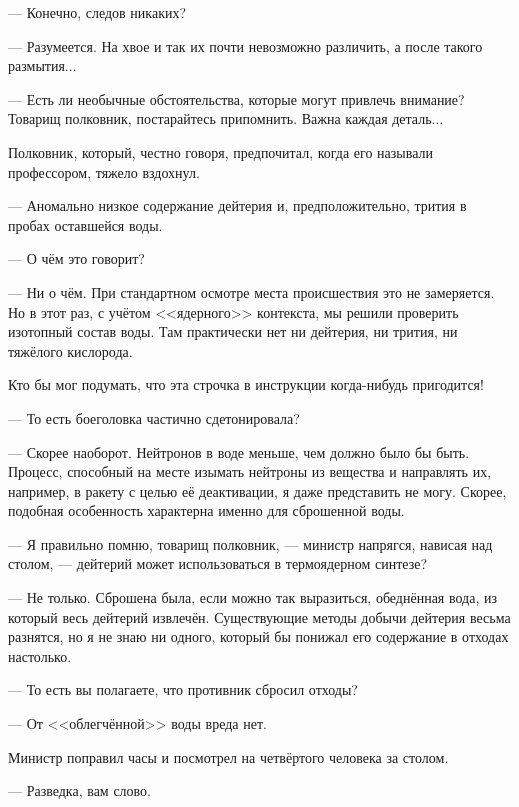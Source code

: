 --- Конечно, следов никаких?

--- Разумеется. На хвое и так их почти невозможно различить, а после такого размытия...

--- Есть ли необычные обстоятельства, которые могут привлечь внимание? Товарищ полковник, постарайтесь припомнить.
Важна каждая деталь...

Полковник, который, честно говоря, предпочитал, когда его называли профессором, тяжело вздохнул.

--- Аномально низкое содержание дейтерия и, предположительно, трития в пробах оставшейся воды.

--- О чём это говорит?

--- Ни о чём. При стандартном осмотре места происшествия это не замеряется. Но в этот раз, с учётом <<ядерного>> контекста,
мы решили проверить изотопный состав воды. Там практически нет ни дейтерия, ни трития, ни тяжёлого кислорода.

Кто бы мог подумать, что эта строчка в инструкции когда-нибудь пригодится!

--- То есть боеголовка частично сдетонировала?

--- Скорее наоборот. Нейтронов в воде меньше, чем должно было бы быть.
Процесс, способный на месте изымать нейтроны из вещества и направлять их, например, в ракету с целью её деактивации,
я даже представить не могу. Скорее, подобная особенность характерна именно для сброшенной воды.

--- Я правильно помню, товарищ полковник, --- министр напрягся, нависая над столом,
--- дейтерий может использоваться в термоядерном синтезе?

--- Не только. Сброшена была, если можно так выразиться, обеднённая вода, из который весь дейтерий извлечён.
Существующие методы добычи дейтерия весьма разнятся, но я не знаю ни одного,
который бы понижал его содержание в отходах настолько.

--- То есть вы полагаете, что противник сбросил отходы?

--- От <<облегчённой>> воды вреда нет.

Министр поправил часы и посмотрел на четвёртого человека за столом.

--- Разведка, вам слово.

